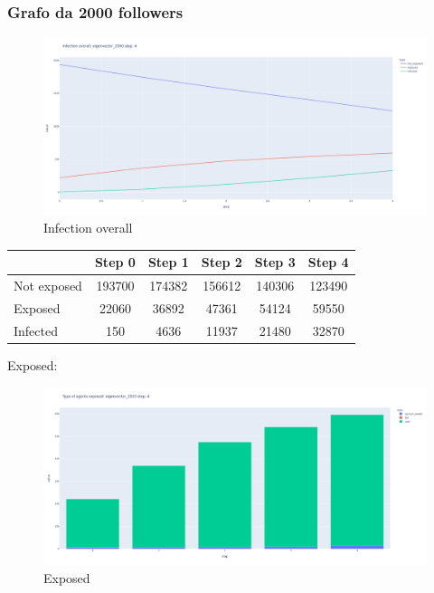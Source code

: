        
        \subsubsection{Grafo da 2000 followers}
        
        \begin{figure}[H]
                \includegraphics[width=16cm]{resources/charts/eig_2000_line.png}
                \caption{Infection overall}
                \label{fig:eig_2000_line}
        \end{figure}
        
        
        \begin{table}[H]
            \centering
            \begin{tabular}{|l|c|c|c|c|c|}
            \hline
                        & Step 0 & Step 1 & Step 2 & Step 3 & Step 4 \\ \hline
            Not exposed & 193700 & 174382 & 156612 & 140306 & 123490 \\ \hline
            Exposed     & 22060  & 36892  & 47361  & 54124  & 59550  \\ \hline
            Infected    & 150    & 4636   & 11937  & 21480  & 32870  \\ \hline
            \end{tabular}
        \end{table}
        
        Exposed:
        \begin{figure}[H]
            \includegraphics[width=16cm]{resources/charts/eig_2000_bar.png}
            \caption{Exposed}
            \label{fig:eig_2000_bar}
        \end{figure}
        
